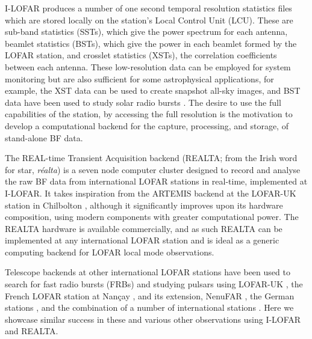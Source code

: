 I-LOFAR produces a number of one second temporal resolution statistics files which are stored locally on the station's Local Control Unit (LCU). These are sub-band statistics (SSTs), which give the power spectrum for each antenna, beamlet statistics (BSTs), which give the power in each beamlet formed by the LOFAR station, and crosslet statistics (XSTs), the correlation coefficients between each antenna. These low-resolution data can be employed for system monitoring but are also sufficient for some astrophysical applications, for example, the XST data can be used to create snapshot all-sky images, and BST data have been used to study solar radio bursts \citep{Maguire2020}. The desire to use the full capabilities of the station, by accessing the full resolution is the motivation to develop a computational backend for the capture,  processing, and storage, of stand-alone BF data. 

The REAL-time Transient Acquisition backend (REALTA; from the Irish word for star, \textit{r\'ealta}) is a seven node computer cluster designed to record and analyse the raw BF data from international LOFAR stations in real-time, implemented at I-LOFAR. It takes inspiration from the ARTEMIS backend at the LOFAR-UK station in Chilbolton \citep{Serylak2012,Karastergiou2015}, although it significantly improves upon its hardware composition, using modern components with greater computational power. The REALTA hardware is available commercially, and as such REALTA can be implemented at any international LOFAR station and is ideal as a generic computing backend for LOFAR local mode observations.

Telescope backends at other international LOFAR stations have been used to search for fast radio bursts (FRBs) and studying pulsars using LOFAR-UK \citep[for example,][]{Karastergiou2015}, the French LOFAR station at Nançay \citep[for example,][]{Rajwade2016,Bondonneau2017}, and its extension, NenuFAR \citep[for example,][]{Bondonneau2020b}, the German stations \citep[e.g][]{Donner2019, Porayko2019, Tiburzi2019}, and the combination of a number of international stations \citep[for example,][]{Mereghetti2016, Hermsen2018, Michilli2018}. Here we showcase similar success in these and various other observations using I-LOFAR and REALTA. 


